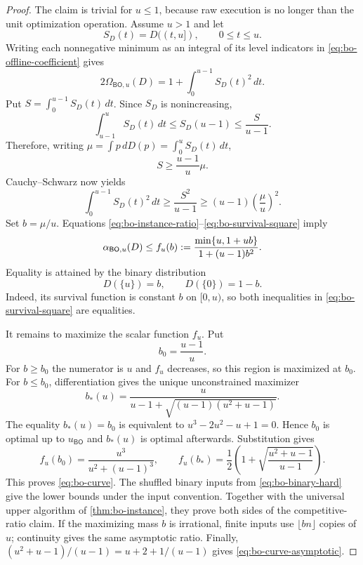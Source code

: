 \begin{proof}
The claim is trivial for $u\le1$, because raw execution is no longer than
the unit optimization operation.  Assume $u>1$ and let
\[
 S_D(t)=D((t,u]),\qquad 0\le t\le u.
\]
Writing each nonnegative minimum as an integral of its level indicators in
\eqref{eq:bo-offline-coefficient} gives
\begin{equation}
 2\Omega_{\mathsf{BO},u}(D)
 =1+\int_0^{u-1}S_D(t)^2\,dt.
 \label{eq:bo-layer-cake}
\end{equation}
Put $S=\int_0^{u-1}S_D(t)\,dt$.  Since $S_D$ is nonincreasing,
\[
 \int_{u-1}^uS_D(t)\,dt
 \le S_D(u-1)
 \le\frac{S}{u-1}.
\]
Therefore, writing $\mu=\int p\,dD(p)=\int_0^uS_D(t)\,dt$,
\begin{equation}
 S\ge\frac{u-1}{u}\mu.
 \label{eq:bo-survival-mean}
\end{equation}
Cauchy--Schwarz now yields
\begin{equation}
 \int_0^{u-1}S_D(t)^2\,dt
 \ge\frac{S^2}{u-1}
 \ge (u-1)\left(\frac\mu u\right)^2.
 \label{eq:bo-survival-square}
\end{equation}
Set $b=\mu/u$.  Equations
\eqref{eq:bo-instance-ratio}--\eqref{eq:bo-survival-square} imply
\begin{equation}
 \alpha_{\mathsf{BO},u}(D)
 \le f_u(b)
 \mathrel{:=}\frac{\min\{u,1+ub\}}{1+(u-1)b^2}.
 \label{eq:bo-binary-envelope}
\end{equation}
Equality is attained by the binary distribution
\begin{equation}
 D(\{u\})=b,
 \qquad
 D(\{0\})=1-b.
 \label{eq:bo-binary-hard}
\end{equation}
Indeed, its survival function is constant $b$ on $[0,u)$, so both
inequalities in \eqref{eq:bo-survival-square} are equalities.

It remains to maximize the scalar function $f_u$.  Put
\[
 b_0=\frac{u-1}{u}.
\]
For $b\ge b_0$ the numerator is $u$ and $f_u$ decreases, so this region is
maximized at $b_0$.  For $b\le b_0$, differentiation gives the unique
unconstrained maximizer
\begin{equation}
 b_*(u)=
 \frac{u}
 {u-1+\sqrt{(u-1)(u^2+u-1)}}.
 \label{eq:bo-b-star}
\end{equation}
The equality $b_*(u)=b_0$ is equivalent to
$u^3-2u^2-u+1=0$.  Hence $b_0$ is optimal up to $u_{\mathsf{BO}}$ and $b_*(u)$ is
optimal afterwards.  Substitution gives
\[
 f_u(b_0)=\frac{u^3}{u^2+(u-1)^3},
 \qquad
 f_u(b_*)=\frac12\left(
  1+\sqrt{\frac{u^2+u-1}{u-1}}\right).
\]
This proves \eqref{eq:bo-curve}.  The shuffled binary inputs from
\eqref{eq:bo-binary-hard} give the lower bounds under the input convention.
Together with the universal upper algorithm of
\cref{thm:bo-instance}, they prove both sides of the competitive-ratio claim.
If the maximizing mass $b$ is irrational, finite inputs use
$\lfloor bn\rfloor$ copies of $u$; continuity gives the same asymptotic
ratio.
Finally,
$(u^2+u-1)/(u-1)=u+2+1/(u-1)$ gives
\eqref{eq:bo-curve-asymptotic}.
\end{proof}

